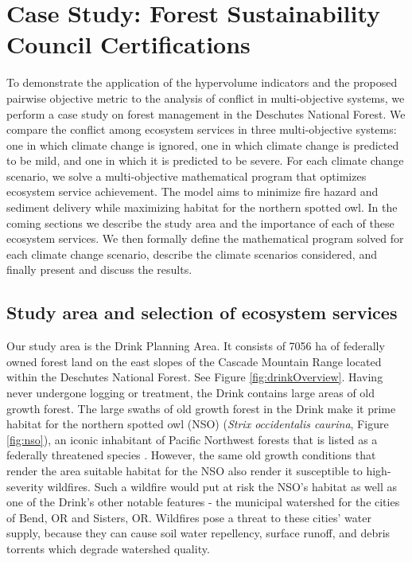 \section{Case Study: Forest Sustainability Council Certifications}
\label{sec:caseStudy}
To demonstrate the application of the hypervolume indicators and the proposed pairwise objective metric to the analysis of conflict in multi-objective systems, we perform a case study on forest management in the Deschutes National Forest. We compare the conflict among ecosystem services in three multi-objective systems: one in which climate change is ignored, one in which climate change is predicted to be mild, and one in which it is predicted to be severe. For each climate change scenario, we solve a multi-objective mathematical program that optimizes ecosystem service achievement. The model aims to minimize fire hazard and sediment delivery while maximizing habitat for the northern spotted owl. In the coming sections we describe the study area and the importance of each of these ecosystem services. We then formally define the mathematical program solved for each climate change scenario, describe the climate scenarios considered, and finally present and discuss the results.

\subsection{Study area and selection of ecosystem services}
\label{subsec:studyArea}
Our study area is the Drink Planning Area. It consists of 7056 ha of federally owned forest land on the east slopes of the Cascade Mountain Range located within the Deschutes National Forest. See Figure \ref{fig:drinkOverview}. Having never undergone logging or treatment, the Drink contains large areas of old growth forest. The large swaths of old growth forest in the Drink make it prime habitat for the northern spotted owl (NSO) (\textit{Strix occidentalis caurina}, Figure \ref{fig:nso}), an iconic %
inhabitant of Pacific Northwest forests that is listed as a federally threatened species \cite{congress1973endangered}. However, the same old growth conditions that render the area suitable habitat for the NSO also render it susceptible to high-severity wildfires. Such a wildfire would put at risk the NSO's habitat \cite{courtney2004scientific} as well as one of the Drink's other notable features - the municipal watershed for the cities of Bend, OR and Sisters, OR. Wildfires pose a threat to these cities' water supply, because they can cause soil water repellency, surface runoff, and debris torrents \cite{ice2004effects} which degrade watershed quality.


